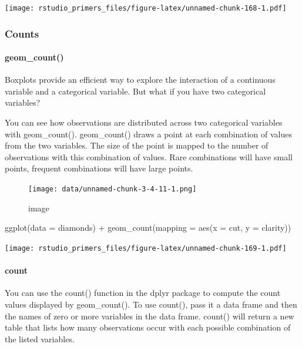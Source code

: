 \documentclass[
]{article}
\newenvironment{Shaded}{\begin{snugshade}}{\end{snugshade}}
\newcommand{\AttributeTok}[1]{\textcolor[rgb]{0.77,0.63,0.00}{#1}}
\newcommand{\FunctionTok}[1]{\textcolor[rgb]{0.00,0.00,0.00}{#1}}
\newcommand{\NormalTok}[1]{#1}
\newcommand{\SpecialCharTok}[1]{\textcolor[rgb]{0.00,0.00,0.00}{#1}}
\begin{document}
\texttt{[image: rstudio\_primers\_files/figure-latex/unnamed-chunk-168-1.pdf]}

\hypertarget{counts}{%
\subsubsection{Counts}\label{counts}}

\hypertarget{geom_count}{%
\paragraph{geom\_count()}\label{geom_count}}

Boxplots provide an efficient way to explore the interaction of a
continuous variable and a categorical variable. But what if you have two
categorical variables?

You can see how observations are distributed across two categorical
variables with geom\_count(). geom\_count() draws a point at each
combination of values from the two variables. The size of the point is
mapped to the number of observations with this combination of values.
Rare combinations will have small points, frequent combinations will
have large points.

\begin{figure}
\centering
\texttt{[image: data/unnamed-chunk-3-4-11-1.png]}
\caption{image}
\end{figure}

\begin{Shaded}
\begin{Highlighting}[]
\FunctionTok{ggplot}\NormalTok{(}\AttributeTok{data =}\NormalTok{ diamonds) }\SpecialCharTok{+} 
  \FunctionTok{geom\_count}\NormalTok{(}\AttributeTok{mapping =} \FunctionTok{aes}\NormalTok{(}\AttributeTok{x =}\NormalTok{ cut, }\AttributeTok{y =}\NormalTok{ clarity))}
\end{Highlighting}
\end{Shaded}

\texttt{[image: rstudio\_primers\_files/figure-latex/unnamed-chunk-169-1.pdf]}

\hypertarget{count}{%
\paragraph{count}\label{count}}

You can use the count() function in the dplyr package to compute the
count values displayed by geom\_count(). To use count(), pass it a data
frame and then the names of zero or more variables in the data frame.
count() will return a new table that lists how many observations occur
with each possible combination of the listed variables.
\end{document}
